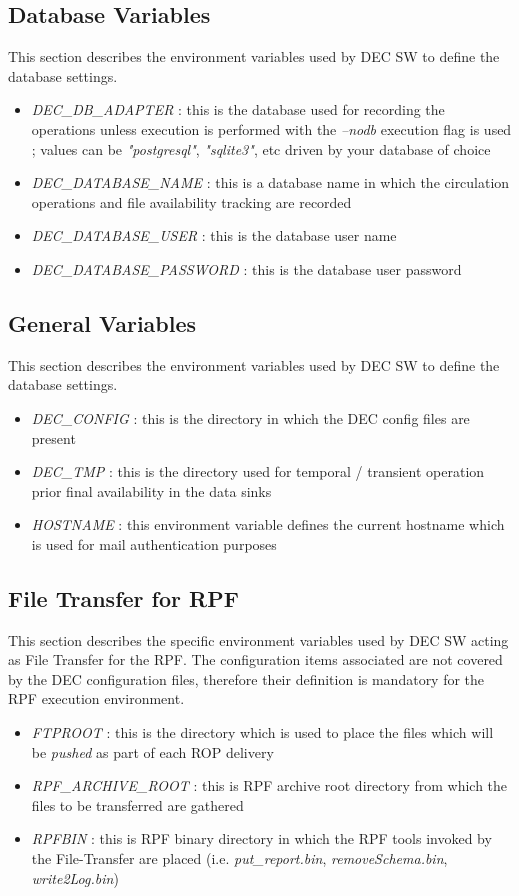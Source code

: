 \documentclass[dec_sum_main.tex]{subfiles}
\begin{document}
\subsection{Database Variables} \label{Database Variables}
This section describes the environment variables used by DEC SW to define the database settings.
\begin{itemize}
	\item \textit{DEC\_DB\_ADAPTER} : this is the database used for recording the operations unless execution is performed with the \textit{--nodb} execution flag is used ; values can be \textit{"postgresql"}, \textit{"sqlite3"}, etc driven by your database of choice 
	\item \textit{DEC\_DATABASE\_NAME} : this is a database name in which the circulation operations and file availability tracking are recorded
	\item \textit{DEC\_DATABASE\_USER} : this is the database user name
	\item \textit{DEC\_DATABASE\_PASSWORD} : this is the database user password
\end{itemize}

\subsection{General Variables} \label{General Variables}
This section describes the environment variables used by DEC SW to define the database settings.
\begin{itemize}
	\item \textit{DEC\_CONFIG} : this is the directory in which the DEC config files are present
	\item \textit{DEC\_TMP} : this is the directory used for temporal / transient operation prior final availability in the data sinks
	\item \textit{HOSTNAME} : this environment variable defines the current hostname which is used for mail authentication purposes	
\end{itemize}

\subsection{File Transfer for RPF}
This section describes the specific environment variables used by DEC SW acting as File Transfer for the RPF. The configuration items associated are not covered by the DEC configuration files, therefore their definition is mandatory for the RPF execution environment.
\begin{itemize}
	\item \textit{FTPROOT} : this is the directory which is used to place the files which will be \textit{pushed} as part of each ROP delivery
	\item \textit{RPF\_ARCHIVE\_ROOT} : this is RPF archive root directory from which the files to be transferred are gathered
	\item \textit{RPFBIN} : this is RPF binary directory in which the RPF tools invoked by the File-Transfer are placed (i.e. \textit{put\_report.bin}, \textit{removeSchema.bin}, \textit{write2Log.bin})
\end{itemize}
\end{document}
